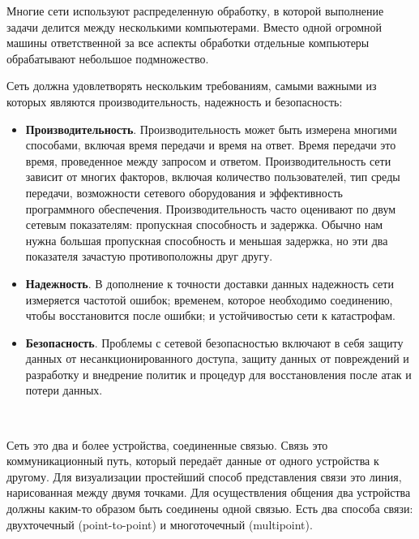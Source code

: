 Многие сети используют распределенную обработку, в которой выполнение задачи делится между несколькими компьютерами. Вместо одной огромной машины ответственной за все аспекты обработки отдельные компьютеры обрабатывают небольшое подмножество.

Сеть должна удовлетворять нескольким требованиям, самыми важными из которых являются производительность, надежность и безопасность: \\

\begin{itemize}
  \item \textbf{Производительность}. Производительность может быть измерена многими способами, включая время передачи и время на ответ. Время передачи это время, проведенное между запросом и ответом. Производительность сети зависит от многих факторов, включая количество пользователей, тип среды передачи, возможности сетевого оборудования и эффективность программного обеспечения. Производительность часто оценивают по двум сетевым показателям: пропускная способность и задержка. Обычно нам нужна большая пропускная способность и меньшая задержка, но эти два показателя зачастую противоположны друг другу. 
  \item \textbf{Надежность}. В дополнение к точности доставки данных надежность сети измеряется частотой ошибок; временем, которое необходимо соединению, чтобы восстановится после ошибки; и устойчивостью сети к катастрофам.
  \item \textbf{Безопасность}. Проблемы с сетевой безопасностью включают в себя защиту данных от несанкционированного доступа, защиту данных от повреждений и разработку и внедрение политик и процедур для восстановления после атак и потери данных.
\end{itemize}
\


Сеть это два и более устройства, соединенные связью. Связь это коммуникационный путь, который передаёт данные от одного устройства к другому. Для визуализации простейший способ представления связи это линия, нарисованная между двумя точками. Для осуществления общения два устройства должны каким-то образом быть соединены одной связью. Есть два способа связи: двухточечный (point-to-point) и многоточечный (multipoint). \\

